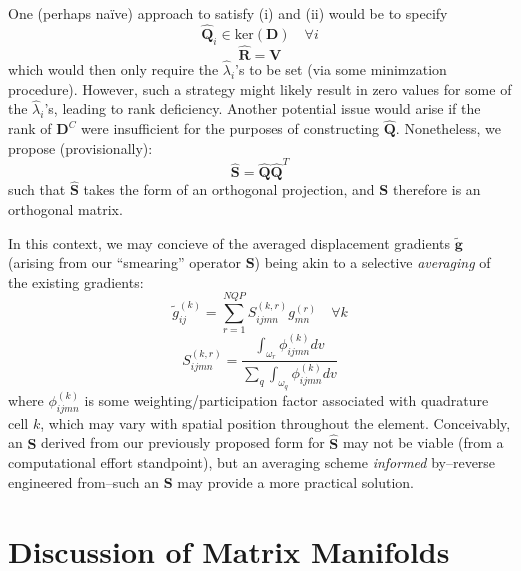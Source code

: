 \documentclass[12pt]{article}
\begin{document}
One (perhaps na\"{i}ve) approach to satisfy (i) and (ii) would be to specify
\begin{equation}
        \hat{\mathbf{Q}}_i \in \mbox{ker} ( \mathbf{D} ) \quad \forall i
\end{equation}
\begin{equation}
        \hat{\mathbf{R}} = \mathbf{V}
\end{equation}
which would then only require the $\hat{\lambda}_i$'s to be set (via some minimzation procedure). However, such a strategy might likely result in zero values for some of the $\hat{\lambda}_i$'s, leading to rank deficiency. Another potential issue would arise if the rank of $\mathbf{D}^C$ were insufficient for the purposes of constructing $\hat{\mathbf{Q}}$. Nonetheless, we propose (provisionally):
\begin{equation}
        \hat{\mathbf{S}} = \hat{\mathbf{Q}} \hat{{\mathbf{Q}}}^T
\end{equation}
such that $\hat{\mathbf{S}}$ takes the form of an orthogonal projection, and $\mathbf{S}$ therefore is an orthogonal matrix.

In this context, we may concieve of the averaged displacement gradients $\tilde{\mathbf{g}}$ (arising from our ``smearing'' operator $\mathbf{S}$) being akin to a selective \textit{averaging} of the existing gradients:
\begin{equation}
        \tilde{g}^{(k)}_{ij} = \sum_{r = 1}^{NQP} S^{(k,r)}_{ijmn} g^{(r)}_{mn} \quad \forall k
\end{equation}
\begin{equation}
        S^{(k,r)}_{ijmn} = \frac{\int_{\omega_r} \phi^{(k)}_{ijmn} dv}{\sum_q \int_{\omega_q} \phi^{(k)}_{ijmn} dv}
\end{equation}
where $\phi^{(k)}_{ijmn}$ is some weighting/participation factor associated with quadrature cell $k$, which may vary with spatial position throughout the element. Conceivably, an $\mathbf{S}$ derived from our previously proposed form for $\hat{\mathbf{S}}$ may not be viable (from a computational effort standpoint), but an averaging scheme \textit{informed} by--reverse engineered from--such an $\mathbf{S}$ may provide a more practical solution.

\newpage

\section{Discussion of Matrix Manifolds}
\end{document}
